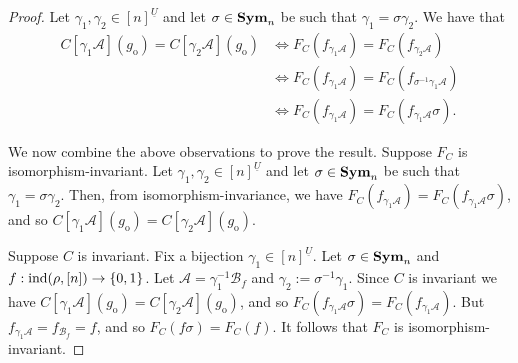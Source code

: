 \documentclass[../paper.tex]{subfiles}
\begin{document}
\begin{proof}
  Let $\gamma_1, \gamma_2 \in [n]^{\underline{U}}$ and let $\sigma \in \text{\textbf{Sym}}_n$
  be such that $\gamma_1 = \sigma \gamma_2$. We have that
  \begin{align*}
    C[\gamma_1 \mathcal{A}](g_{\text{o}}) = C[\gamma_2 \mathcal{A}](g_{\text{o}}) & \Leftrightarrow  F_C(f_{\gamma_1 \mathcal{A}}) = F_C (f_{\gamma_2 \mathcal{A}}) \\
                                                                                  & \Leftrightarrow F_C(f_{\gamma_1 \mathcal{A}}) = F_C (f_{\sigma^{-1}\gamma_1 \mathcal{A}}) \\
                                                                                  & \Leftrightarrow F_C(f_{\gamma_1 \mathcal{A}}) = F_C ( f_{\gamma_1 \mathcal{A}} \sigma).
  \end{align*}

  We now combine the above observations to prove the result. Suppose $F_C$ is
  isomorphism-invariant. Let $\gamma_1, \gamma_2 \in [n]^{\underline{U}}$ and
  let $\sigma \in \text{\textbf{Sym}}_n$ be such that $\gamma_1 = \sigma \gamma_2$. Then, from
  isomorphism-invariance, we have $F_C(f_{\gamma_1 \mathcal{A}}) = F_C (
  f_{\gamma_1 \mathcal{A}}\sigma)$, and so $C[\gamma_1
  \mathcal{A}](g_{\text{o}}) = C[\gamma_2 \mathcal{A}](g_{\text{o}})$.
  
  Suppose $C$ is invariant. Fix a bijection $\gamma_1 \in [n]^{\underline{U}}$.
  Let $\sigma \in \text{\textbf{Sym}}_n$ and $f: \text{\upshape ind}(\rho, [n]) \rightarrow \{0,1\}$. Let
  $\mathcal{A} = \gamma^{-1}_1 \mathcal{B}_f$ and $\gamma_2 :=
  \sigma^{-1}\gamma_1 $. Since $C$ is invariant we have $C[\gamma_1
  \mathcal{A}](g_{\text{o}}) = C[\gamma_2\mathcal{A}](g_{\text{o}})$, and so
  $F_C (f_{\gamma_1 \mathcal{A}} \sigma) = F_C(f_{\gamma_1 \mathcal{A}})$. But
  $f_{\gamma_1 \mathcal{A}} = f_{\mathcal{B}_f} = f$, and so $F_C (f \sigma) =
  F_C (f)$. It follows that $F_C$ is isomorphism-invariant.


  


\end{proof}
\end{document}
